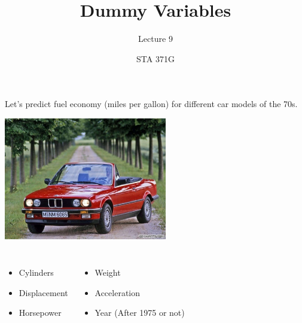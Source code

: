 \documentclass{beamer}\usepackage[]{graphicx}\usepackage[]{color}
\title{Dummy Variables}
\subtitle{Lecture 9}
\author{STA 371G}
\begin{document}
  
  
  

  \frame{\maketitle}



  \begin{darkframes}
     
    \begin{frame}
      \fontsize{9}{9}\selectfont
      Let's predict fuel economy (miles per gallon) for different car models of the 70s.
      
      \begin{center}
        \includegraphics[width=2.8in]{bmw} \\
      \end{center} \pause
      
      \begin{columns}[onlytextwidth]
          \begin{itemize}
            \item Cylinders
            \item Displacement
            \item Horsepower
          \end{itemize}
          \begin{itemize}
            \item Weight
            \item Acceleration
            \item Year (After 1975 or not)
          \end{itemize}
      \end{columns}
    \end{frame}
    

\end{darkframes}
\end{document}
